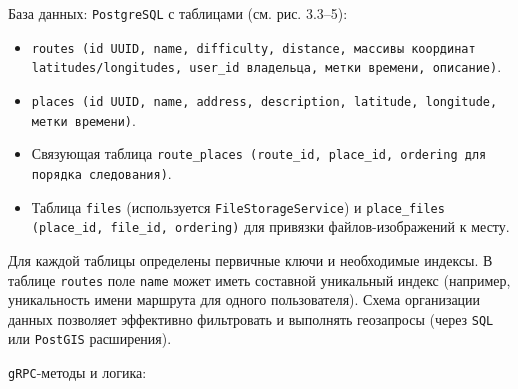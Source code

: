 База данных: \texttt{PostgreSQL} с таблицами (см. рис. 3.3–5):
\begin{itemize}
    \item \texttt{routes (id UUID, name, difficulty, distance, массивы координат \\ latitudes/longitudes, user\_id владельца, метки времени, описание)}.
    \item \texttt{places (id UUID, name, address, description, latitude, longitude, метки времени)}.
    \item Связующая таблица \texttt{route\_places (route\_id, place\_id, ordering для порядка следования)}.
    \item Таблица \texttt{files} (используется \texttt{FileStorageService}) и \texttt{place\_files (place\_id, file\_id, ordering)} для привязки файлов-изображений к месту.
\end{itemize}
Для каждой таблицы определены первичные ключи и необходимые индексы. В таблице \texttt{routes} поле \texttt{name} может иметь составной уникальный индекс (например, уникальность имени маршрута для одного пользователя). Схема организации данных позволяет эффективно фильтровать и выполнять геозапросы (через \texttt{SQL} или \texttt{PostGIS} расширения).

\texttt{gRPC}-методы и логика:

